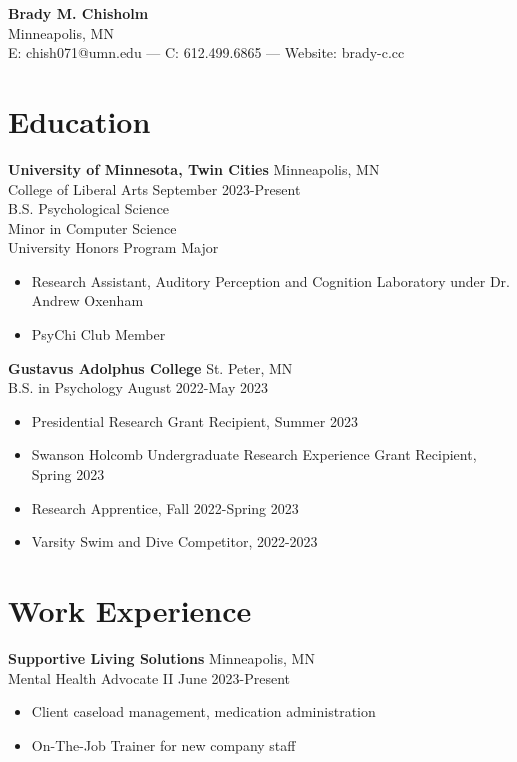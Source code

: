 \documentclass[11pt]{article}
\begin{document}
\begin{center}
    \textbf{\Large Brady M. Chisholm} \\
    Minneapolis, MN \\
    E: chish071@umn.edu \quad — \quad C: 612.499.6865 \quad — \quad Website: brady-c.cc
\end{center}

\vspace{-0.1in}  %

\section*{Education}
\vspace{-0.02in}

\textbf{University of Minnesota, Twin Cities} \hfill Minneapolis, MN \\
College of Liberal Arts \hfill September 2023-Present \\
B.S. Psychological Science \\
Minor in Computer Science \\
University Honors Program Major
\begin{itemize}
    \item Research Assistant, Auditory Perception and Cognition Laboratory under Dr. Andrew Oxenham
    \item PsyChi Club Member
\end{itemize}

\textbf{Gustavus Adolphus College} \hfill St. Peter, MN \\
B.S. in Psychology \hfill August 2022-May 2023
\begin{itemize}
    \item Presidential Research Grant Recipient, Summer 2023
    \item Swanson Holcomb Undergraduate Research Experience Grant Recipient, Spring 2023
    \item Research Apprentice, Fall 2022-Spring 2023
    \item Varsity Swim and Dive Competitor, 2022-2023
\end{itemize}

\section*{Work Experience}
\vspace{-0.05in}

\textbf{Supportive Living Solutions} \hfill Minneapolis, MN \\
Mental Health Advocate II \hfill June 2023-Present
\begin{itemize}
    \item Client caseload management, medication administration 
    \item On-The-Job Trainer for new company staff 
\end{itemize}
\end{document}
